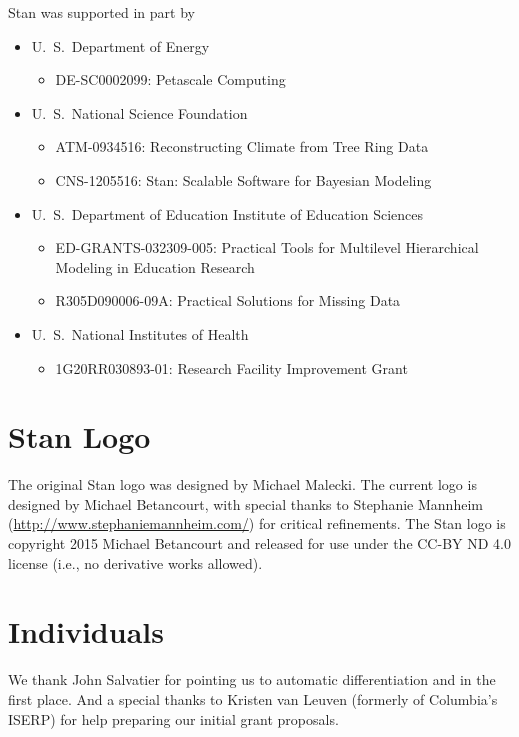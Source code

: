 Stan was supported in part by
%
\begin{itemize}
\item
U.~S.\ Department of Energy
\begin{itemize}\small
\item DE-SC0002099: Petascale Computing
\end{itemize}
%
\item
U.~S.\ National Science Foundation
\begin{itemize}\small
\item
ATM-0934516: Reconstructing Climate from Tree Ring Data
\item
CNS-1205516: Stan: Scalable Software for Bayesian Modeling
\end{itemize}
%
\item
U.~S.\ Department of Education Institute of Education Sciences
\begin{itemize}\small
\item ED-GRANTS-032309-005:
Practical Tools for Multilevel Hierarchical Modeling in Education
 Research
\item R305D090006-09A: Practical Solutions for Missing Data
\end{itemize}
\item
U.~S.\ National Institutes of Health
\begin{itemize}
\item 1G20RR030893-01: Research Facility Improvement Grant
\end{itemize}
\end{itemize}


\section*{Stan Logo}

The original Stan logo was designed by Michael Malecki.  The current
logo is designed by Michael Betancourt, with special thanks to
Stephanie Mannheim (\url{http://www.stephaniemannheim.com/}) for
critical refinements.  The Stan logo is copyright 2015 Michael
Betancourt and released for use under the CC-BY ND 4.0 license (i.e.,
no derivative works allowed).


\section*{Individuals}

We thank John Salvatier for pointing us to automatic differentiation
and \HMC in the first place.  And a special thanks to Kristen van
Leuven (formerly of Columbia's ISERP) for help preparing our initial
grant proposals.

